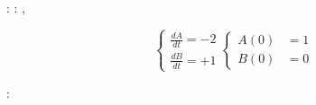 \begin{figure*}[t]
\begin{minipage}[t]{\linewidth}
\begin{minipage}[c]{0.60\linewidth}
\begin{CodeInput}
\begin{Highlighting}[]
          : \OperatorTok{=}\KeywordTok{(}\OperatorTok{=}\KeywordTok{)}
          : \OperatorTok{=}\KeywordTok{(}\OperatorTok{=}\KeywordTok{)}
          \OperatorTok{=}\KeywordTok{(}
          \OperatorTok{=}\KeywordTok{[} \OperatorTok{*}\KeywordTok{]},
          \OperatorTok{=}\NormalTok{\KeywordTok{[}B\KeywordTok{]},}
          \OperatorTok{=}\NormalTok{,}
          \KeywordTok{    )}
        \end{Highlighting}
        \end{CodeInput}
      \end{minipage}%
      \begin{minipage}[c]{0.40\linewidth}
        \centering 
        \[
        \begin{cases}
            \frac{dA}{dt} = -2 \\
            \frac{dB}{dt} = +1
        \end{cases}
        \begin{cases}
            A(0) &= 1 \\
            B(0) &= 0
        \end{cases}
        \]
      \end{minipage}%
    \end{minipage}%
    \newline
    \begin{minipage}[t]{\linewidth}
        \centering 
        \begin{minipage}[c]{0.60\linewidth}
            \centering 
            \begin{CodeInput}
            \begin{Highlighting}[]
            \KeywordTok{(}\KeywordTok{)}:
            

\end{Highlighting}
\end{CodeInput}
\end{minipage}
\end{minipage}
\end{figure*}
